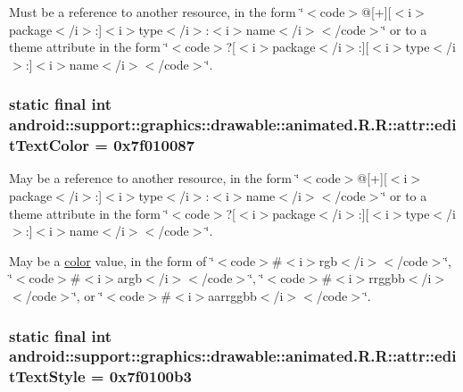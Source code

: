 Must be a reference to another resource, in the form \char`\"{}$<$code$>$@\mbox{[}+\mbox{]}\mbox{[}$<$i$>$package$<$/i$>$:\mbox{]}$<$i$>$type$<$/i$>$:$<$i$>$name$<$/i$>$$<$/code$>$\char`\"{} or to a theme attribute in the form \char`\"{}$<$code$>$?\mbox{[}$<$i$>$package$<$/i$>$:\mbox{]}\mbox{[}$<$i$>$type$<$/i$>$:\mbox{]}$<$i$>$name$<$/i$>$$<$/code$>$\char`\"{}. \hypertarget{classandroid_1_1support_1_1graphics_1_1drawable_1_1animated_1_1_r_1_1attr_e9ffb4163bd7b00d058ec357277b496b}{
\subsubsection[{editTextColor}]{\setlength{\rightskip}{0pt plus 5cm}static final int android::support::graphics::drawable::animated.R.R::attr::editTextColor = 0x7f010087}}
\label{classandroid_1_1support_1_1graphics_1_1drawable_1_1animated_1_1_r_1_1attr_e9ffb4163bd7b00d058ec357277b496b}


May be a reference to another resource, in the form \char`\"{}$<$code$>$@\mbox{[}+\mbox{]}\mbox{[}$<$i$>$package$<$/i$>$:\mbox{]}$<$i$>$type$<$/i$>$:$<$i$>$name$<$/i$>$$<$/code$>$\char`\"{} or to a theme attribute in the form \char`\"{}$<$code$>$?\mbox{[}$<$i$>$package$<$/i$>$:\mbox{]}\mbox{[}$<$i$>$type$<$/i$>$:\mbox{]}$<$i$>$name$<$/i$>$$<$/code$>$\char`\"{}. 

May be a \hyperlink{classandroid_1_1support_1_1graphics_1_1drawable_1_1animated_1_1_r_1_1color}{color} value, in the form of \char`\"{}$<$code$>$\#$<$i$>$rgb$<$/i$>$$<$/code$>$\char`\"{}, \char`\"{}$<$code$>$\#$<$i$>$argb$<$/i$>$$<$/code$>$\char`\"{}, \char`\"{}$<$code$>$\#$<$i$>$rrggbb$<$/i$>$$<$/code$>$\char`\"{}, or \char`\"{}$<$code$>$\#$<$i$>$aarrggbb$<$/i$>$$<$/code$>$\char`\"{}. \hypertarget{classandroid_1_1support_1_1graphics_1_1drawable_1_1animated_1_1_r_1_1attr_dd7adff4a4af0a48ef66058e03c78857}{
\subsubsection[{editTextStyle}]{\setlength{\rightskip}{0pt plus 5cm}static final int android::support::graphics::drawable::animated.R.R::attr::editTextStyle = 0x7f0100b3}}
\label{classandroid_1_1support_1_1graphics_1_1drawable_1_1animated_1_1_r_1_1attr_dd7adff4a4af0a48ef66058e03c78857}


